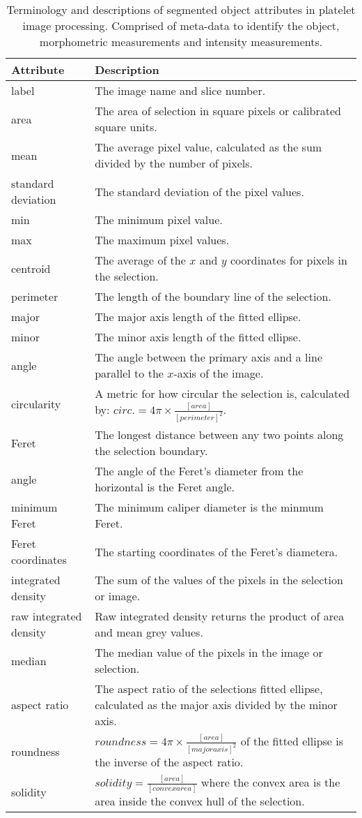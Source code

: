 \begin{table}[htbp]
\caption[Platelets segmented region attributes and properties]{Terminology and descriptions of segmented object attributes in platelet image processing. Comprised of meta-data to identify the object, morphometric measurements and intensity measurements.}
\centering
\label{table:platelets:region_properties}
\begin{tabular}{p{4cm} p{10cm}}
	\toprule
	Attribute  & Description \\
	\midrule
	label & The image name and slice number.\\
	area & The area of selection in square pixels or calibrated square units.\\
	mean & The average pixel value, calculated as the sum divided by the number of pixels. \\
	standard deviation & The standard deviation of the pixel values. \\
	min & The minimum pixel value. \\
	max & The maximum pixel values. \\
	centroid & The average of the $x$ and $y$ coordinates for pixels in the selection. \\
	perimeter & The length of the boundary line of the selection. \\
	major & The major axis length of the fitted ellipse. \\
	minor & The minor axis length of the fitted ellipse. \\
	angle & The angle between the primary axis and a line parallel to the $x$-axis of the image. \\
	circularity & A metric for how circular the selection is, calculated by: $circ.=4\pi \times \frac{[area]}{[perimeter]^2}$. \\
	Feret & The longest distance between any two points along the selection boundary. \\
	angle & The angle of the Feret's diameter from the horizontal is the Feret angle. \\
	minimum Feret & The minimum caliper diameter is the minmum Feret. \\
	Feret coordinates & The starting coordinates of the Feret's diametera. \\
	integrated density & The sum of the values of the pixels in the selection or image. \\
	raw integrated density & Raw integrated density returns the product of area and mean grey values. \\
	median & The median value of the pixels in the image or selection. \\
	aspect ratio & The aspect ratio of the selections fitted ellipse, calculated as the major axis divided by the minor axis. \\
	roundness & $roundness=4\pi \times \frac{[area]}{[major axis]^2}$ of the fitted ellipse is the inverse of the aspect ratio. \\
	solidity & $solidity=\frac{[area]}{[convex area]}$ where the convex area is the area inside the convex hull of the selection. \\
	\bottomrule
\end{tabular}
\end{table}

